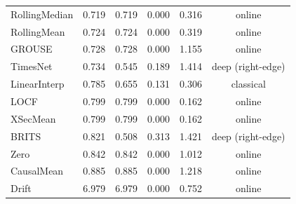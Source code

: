 \begin{table}[tbp]
\begin{tabular}{@{}lccccc@{}}
RollingMedian & 0.719 & 0.719 & 0.000 & 0.316 & online \\
RollingMean & 0.724 & 0.724 & 0.000 & 0.319 & online \\
GROUSE & 0.728 & 0.728 & 0.000 & 1.155 & online \\
TimesNet & 0.734 & 0.545 & 0.189 & 1.414 & deep (right-edge) \\
LinearInterp & 0.785 & 0.655 & 0.131 & 0.306 & classical \\
LOCF & 0.799 & 0.799 & 0.000 & 0.162 & online \\
XSecMean & 0.799 & 0.799 & 0.000 & 0.162 & online \\
BRITS & 0.821 & 0.508 & 0.313 & 1.421 & deep (right-edge) \\
Zero & 0.842 & 0.842 & 0.000 & 1.012 & online \\
CausalMean & 0.885 & 0.885 & 0.000 & 1.218 & online \\
Drift & 6.979 & 6.979 & 0.000 & 0.752 & online \\
\bottomrule
\end{tabular}
\end{table}
